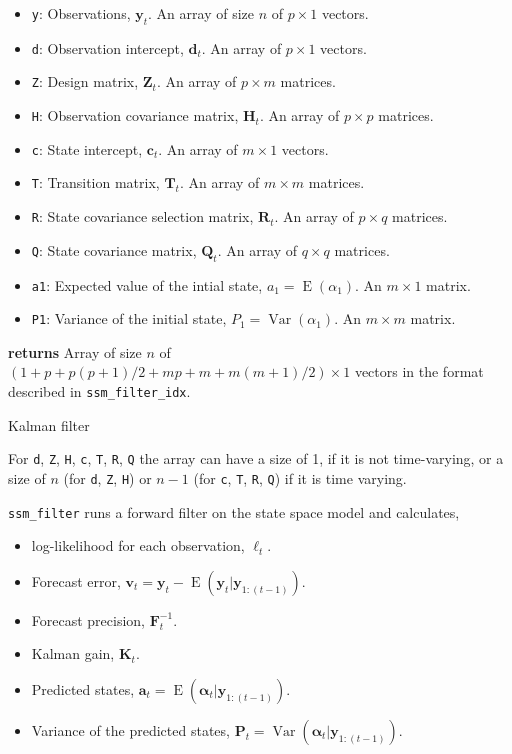 \documentclass[]{book}
\providecommand{\tightlist}{%
  \setlength{\itemsep}{0pt}\setlength{\parskip}{0pt}}
\DeclareMathOperator{\E}{E}
\DeclareMathOperator{\Var}{Var}
\newcommand{\mat}[1]{\boldsymbol{#1}}
\renewcommand{\vec}[1]{\boldsymbol{#1}}
\begin{document}
\begin{itemize}
\tightlist
\item
  \texttt{y}: Observations, \(\vec{y}_t\). An array of size \(n\) of
  \(p \times 1\) vectors.
\item
  \texttt{d}: Observation intercept, \(\vec{d}_t\). An array of
  \(p \times 1\) vectors.
\item
  \texttt{Z}: Design matrix, \(\mat{Z}_t\). An array of \(p \times m\)
  matrices.
\item
  \texttt{H}: Observation covariance matrix, \(\mat{H}_t\). An array of
  \(p \times p\) matrices.
\item
  \texttt{c}: State intercept, \(\vec{c}_t\). An array of \(m \times 1\)
  vectors.
\item
  \texttt{T}: Transition matrix, \(\mat{T}_t\). An array of
  \(m \times m\) matrices.
\item
  \texttt{R}: State covariance selection matrix, \(\mat{R} _t\). An
  array of \(p \times q\) matrices.
\item
  \texttt{Q}: State covariance matrix, \(\mat{Q}_t\). An array of
  \(q \times q\) matrices.
\item
  \texttt{a1}: Expected value of the intial state,
  \(a_1 = \E(\alpha_1)\). An \(m \times 1\) matrix.
\item
  \texttt{P1}: Variance of the initial state, \(P_1 = \Var(\alpha_1)\).
  An \(m \times m\) matrix.
\end{itemize}

\textbf{returns} Array of size \(n\) of
\((1 + p + p (p + 1) / 2 + mp + m + m (m + 1) / 2) \times 1\) vectors in
the format described in \texttt{ssm\_filter\_idx}.

Kalman filter

For \texttt{d}, \texttt{Z}, \texttt{H}, \texttt{c}, \texttt{T},
\texttt{R}, \texttt{Q} the array can have a size of 1, if it is not
time-varying, or a size of \(n\) (for \texttt{d}, \texttt{Z},
\texttt{H}) or \(n - 1\) (for \texttt{c}, \texttt{T}, \texttt{R},
\texttt{Q}) if it is time varying.

\texttt{ssm\_filter} runs a forward filter on the state space model and
calculates,

\begin{itemize}
\tightlist
\item
  log-likelihood for each observation, \(\ell_t\).
\item
  Forecast error,
  \(\vec{v}_t = \vec{y}_t - \E(\vec{y}_t | \vec{y}_{1:(t -1)})\).
\item
  Forecast precision, \(\mat{F}^{-1}_t\).
\item
  Kalman gain, \(\mat{K}_t\).
\item
  Predicted states,
  \(\vec{a}_t = \E(\vec{\alpha}_t | \vec{y}_{1:(t -1)})\).
\item
  Variance of the predicted states,
  \(\mat{P}_t = \Var(\vec{\alpha}_t | \vec{y}_{1:(t -1)})\).
\end{itemize}
\end{document}
